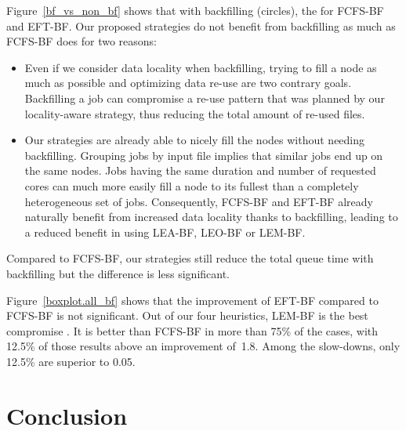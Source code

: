 \documentclass[sigconf,review,anonymous]{acmart}
\newcommand{\rev}[1]{{\color{blue}{#1}}}
\begin{document}
Figure~\ref{bf_vs_non_bf} shows that
with backfilling (circles),
the \rev{difference of performance with or without backfilling is much higher} for FCFS-BF and EFT-BF. 
Our proposed strategies do not benefit from backfilling as much as FCFS-BF does for two reasons:
\begin{itemize}
	\item Even if we consider data locality when backfilling, trying to fill a node as much as possible and optimizing data re-use are two contrary goals. 
	Backfilling a job can compromise a re-use pattern that was planned by our locality-aware strategy, thus reducing the total 
	amount of re-used files.
	\item Our strategies are already able to nicely fill the nodes without needing backfilling.
	Grouping jobs by input file implies that similar jobs end up on the same nodes.
	Jobs having the same duration and number of requested cores can much more easily fill a node to its fullest than a completely heterogeneous set of jobs.
	Consequently, FCFS-BF and EFT-BF already naturally benefit from increased data locality thanks to backfilling, leading to a reduced benefit in using LEA-BF, LEO-BF or LEM-BF.
\end{itemize}
Compared to FCFS-BF, our strategies still reduce the total queue time with backfilling but the difference is less significant.

Figure~\ref{boxplot.all_bf} shows that the improvement of EFT-BF compared to FCFS-BF is not significant.
Out of our four heuristics, LEM-BF is the best compromise \rev{here}.
It is better than FCFS-BF in more than 75\% of the cases, 
with 12.5\% of those results above an improvement of~1.8.
Among the slow-downs, only 12.5\% are superior to 0.05.

\section{Conclusion}\label{sec.conclusion}
\end{document}

